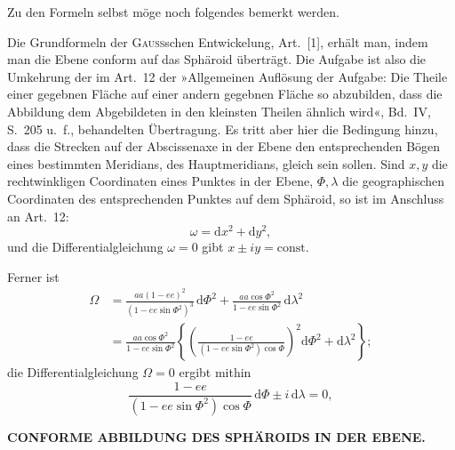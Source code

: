 {Zu den Formeln selbst möge noch folgendes bemerkt werden.

Die Grundformeln der \textsc{Gauss}schen Entwickelung, Art.\ [1], erhält man, indem man
die Ebene conform auf das Sphäroid überträgt. Die Aufgabe ist also die Umkehrung der im
Art.\ 12 der »Allgemeinen Auflösung der Aufgabe: Die Theile einer gegebnen Fläche auf einer
andern gegebnen Fläche so abzubilden, dass die Abbildung dem Abgebildeten in den kleinsten
Theilen ähnlich wird«, Bd.\ IV, S.\ 205 u.\ f., behandelten Übertragung. Es tritt aber hier
die Bedingung hinzu, dass die Strecken auf der Abscissenaxe in der Ebene den entsprechenden
Bögen eines bestimmten Meridians, des Hauptmeridians, gleich sein sollen.
Sind \(x,y\) die rechtwinkligen Coordinaten eines Punktes in der Ebene, \(\Phi,\lambda\) die
geographischen Coordinaten des entsprechenden Punktes auf dem Sphäroid, so ist im Anschluss
an Art.\ 12:
\[
\omega=\mathrm dx^2+\mathrm dy^2,
\]
\noindent und die Differentialgleichung \(\omega=0\) gibt \(x\pm iy=\mathrm{const.}\)

Ferner ist
\[
\begin{aligned}
\Omega&=\frac{aa(1-ee)^2}{(1-ee\sin\Phi^2)^3}\,\mathrm d\Phi^2
 +\frac{aa\cos\Phi^2}{1-ee\sin\Phi^2}\,\mathrm d\lambda^2\\
&=\frac{aa\cos\Phi^2}{1-ee\sin\Phi^2}
\left\{\left(\frac{1-ee}{(1-ee\sin\Phi^2)\cos\Phi}\right)^2
 \mathrm d\Phi^2+\mathrm d\lambda^2\right\};
\end{aligned}
\]
\noindent die Differentialgleichung \(\Omega=0\) ergibt mithin
\[
\frac{1-ee}{(1-ee\sin\Phi^2)\cos\Phi}\,\mathrm d\Phi\pm i\,\mathrm d\lambda=0,
\]
\par}

\par\clearpage
\noindent\null\hfill{\small\textbf{CONFORME ABBILDUNG DES SPHÄROIDS IN DER EBENE.}}\hfill{}\par\medskip

